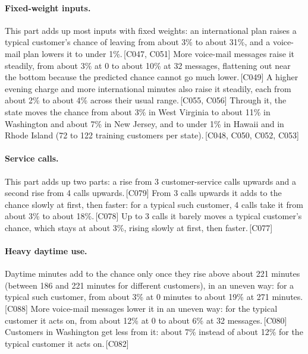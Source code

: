 \documentclass[a4paper,10pt]{article}
\newif\ifreviewmarks
\newcommand{\reviewrule}{\noindent{\color{BrickRed}\rule{\linewidth}{0.8pt}}}
\newenvironment{drafted}[1][]{%
  \ifreviewmarks\par\addvspace{\medskipamount}\reviewrule\par\nopagebreak
  \noindent{\color{BrickRed}\sffamily\footnotesize\textbf{Thesis Draft}\quad #1\hfill review}\par\nopagebreak\smallskip\fi}{%
  \ifreviewmarks\par\smallskip\noindent{\color{BrickRed}\sffamily\footnotesize end of thesis draft}\par\nopagebreak\reviewrule\par\medskip\fi}
\begin{document}
\begin{drafted}[plain-language layer: churn100-s4-c2]
\paragraph{Fixed-weight inputs.} This part adds up most inputs with fixed weights: an international plan raises a typical customer's chance of leaving from about 3\% to about 31\%, and a voice-mail plan lowers it to under 1\%.\,{\scriptsize\textcolor{NavyBlue}{[C047, C051]}} More voice-mail messages raise it steadily, from about 3\% at 0 to about 10\% at 32 messages, flattening out near the bottom because the predicted chance cannot go much lower.\,{\scriptsize\textcolor{NavyBlue}{[C049]}} A higher evening charge and more international minutes also raise it steadily, each from about 2\% to about 4\% across their usual range.\,{\scriptsize\textcolor{NavyBlue}{[C055, C056]}} Through it, the state moves the chance from about 3\% in West Virginia to about 11\% in Washington and about 7\% in New Jersey, and to under 1\% in Hawaii and in Rhode Island (72 to 122 training customers per state).\,{\scriptsize\textcolor{NavyBlue}{[C048, C050, C052, C053]}}
\paragraph{Service calls.} This part adds up two parts: a rise from 3 customer-service calls upwards and a second rise from 4 calls upwards.\,{\scriptsize\textcolor{NavyBlue}{[C079]}} From 3 calls upwards it adds to the chance slowly at first, then faster: for a typical such customer, 4 calls take it from about 3\% to about 18\%.\,{\scriptsize\textcolor{NavyBlue}{[C078]}} Up to 3 calls it barely moves a typical customer's chance, which stays at about 3\%, rising slowly at first, then faster.\,{\scriptsize\textcolor{NavyBlue}{[C077]}}
\paragraph{Heavy daytime use.} Daytime minutes add to the chance only once they rise above about 221 minutes (between 186 and 221 minutes for different customers), in an uneven way: for a typical such customer, from about 3\% at 0 minutes to about 19\% at 271 minutes.\,{\scriptsize\textcolor{NavyBlue}{[C088]}} More voice-mail messages lower it in an uneven way: for the typical customer it acts on, from about 12\% at 0 to about 6\% at 32 messages.\,{\scriptsize\textcolor{NavyBlue}{[C080]}} Customers in Washington get less from it: about 7\% instead of about 12\% for the typical customer it acts on.\,{\scriptsize\textcolor{NavyBlue}{[C082]}}

\end{drafted}
\end{document}
